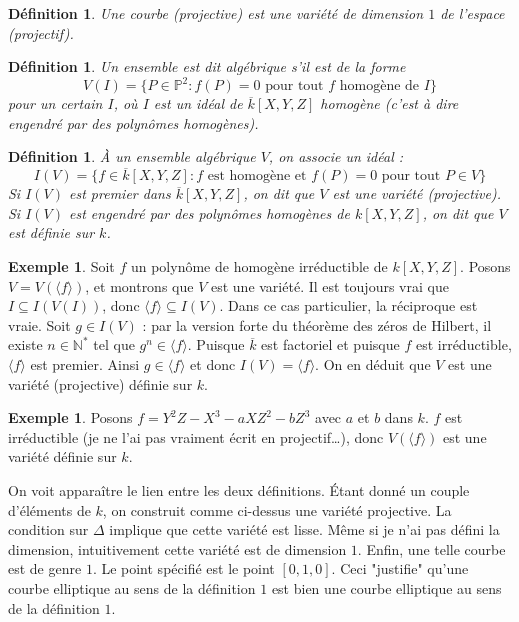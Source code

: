 \documentclass{article}
\theoremstyle{plain}%
\newtheorem{deff}[thm]{Définition}
\theoremstyle{definition}%
\newtheorem{ex}[thm]{Exemple}
\newcommand{\N}{\mathbb{N}}
\begin{document}
\begin{deff}
  Une courbe (projective) est une variété de dimension $1$ de l'espace (projectif).
\end{deff}

\begin{deff}
  Un ensemble est dit algébrique s'il est de la forme $$V(I) = \{ P\in \mathbb{P}^2 : f(P) = 0 \text{ pour tout } f \text{ homogène de } I \}$$ pour un certain $I$, où $I$ est un idéal de $\overline{k}[X, Y, Z]$ homogène (c'est à dire engendré par des polynômes homogènes).
\end{deff}

\begin{deff}
  À un ensemble algébrique $V$, on associe un idéal :
  $$I(V) = \{ f\in \overline{k}[X, Y, Z] : f \text{ est homogène et } f(P) = 0 \text{ pour tout } P\in V \}$$
  Si $I(V)$ est premier dans $ \overline{k}[X, Y, Z] $, on dit que $V$ est une variété (projective). Si $I(V)$ est engendré par des polynômes homogènes de $k[X, Y, Z]$, on dit que $V$ est définie sur $k$.  
\end{deff}



\begin{ex}
  Soit $f$ un polynôme de homogène irréductible de $k[X, Y, Z]$. Posons $V = V(\langle f \rangle)$, et montrons que $V$ est une variété. 
  Il est toujours vrai que $I \subseteq I(V(I))$, donc $\langle f \rangle \subseteq I(V)$. 
  Dans ce cas particulier, la réciproque est vraie. Soit $g\in I(V)$ : par la version forte du théorème des zéros de Hilbert, il existe $n\in\N^*$ tel que $g^n\in \langle f \rangle$.
  Puisque $\overline{k}$ est factoriel et puisque $f$ est irréductible,  $\langle f \rangle$ est premier. Ainsi $g\in \langle f \rangle$ et donc $I(V) = \langle f \rangle$.
  On en déduit que $V$ est une variété (projective) définie sur $k$.
\end{ex}

\begin{ex}
  Posons $f = Y^2 Z - X^3 -aXZ^2 -b Z^3$ avec $a$ et $b$ dans $k$. $f$ est irréductible (je ne l'ai pas vraiment écrit en projectif\ldots), donc $V(\langle f \rangle)$ est une variété définie sur $k$.
\end{ex}

On voit apparaître le lien entre les deux définitions. Étant donné un couple d'éléments de $k$, on construit comme ci-dessus une variété projective. La condition sur $\Delta$ implique que cette variété est lisse. Même si je n'ai pas défini la dimension, intuitivement cette variété est de dimension $1$. Enfin, une telle courbe est de genre $1$. Le point spécifié est le point $[0, 1, 0]$. Ceci "justifie" qu'une courbe elliptique au sens de la définition $1$ est bien une courbe elliptique au sens de la définition $1$. 
\end{document}
